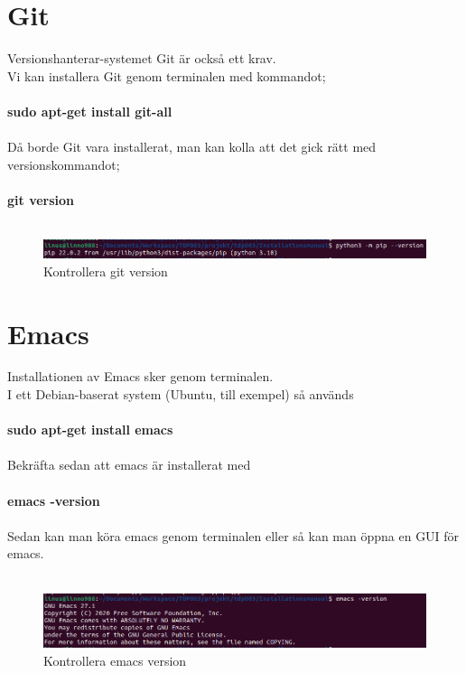 \documentclass{TDP003mall}
\begin{document}
\section{Git}
Versionshanterar-systemet Git är också ett krav.\\ 
Vi kan installera Git genom terminalen med kommandot;\\\\
\textbf{sudo apt-get install git-all}\\\\
Då borde Git vara installerat, man kan kolla att det gick rätt med versionskommandot;\\\\
\textbf{git version}\\\\
\begin{figure}[h]
  \centering
  \includegraphics[scale=0.5]{pip_version}
  \caption{\label{fig:The-caption} Kontrollera git version}
\end{figure}

\section{Emacs}
Installationen av Emacs sker genom terminalen.\\
I ett Debian-baserat system (Ubuntu, till exempel) så används\\\\
\textbf{sudo apt-get install emacs}\\\\
Bekräfta sedan att emacs är installerat med\\\\
\textbf{emacs -version}\\\\
Sedan kan man köra emacs genom terminalen eller så kan man öppna en GUI för emacs.\\\\
\begin{figure}[h]
  \centering
  \includegraphics[scale=0.5]{emacs_version}
  \caption{\label{fig:The-caption} Kontrollera emacs version}
\end{figure}
\end{document}
